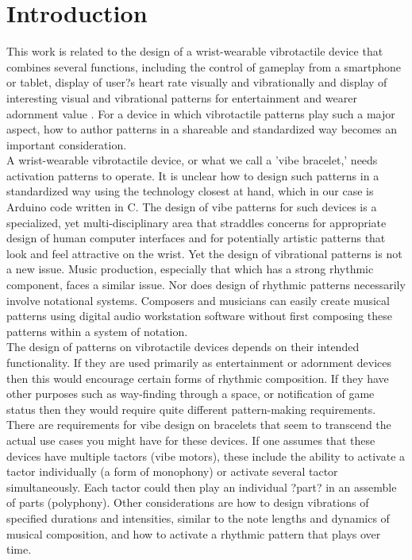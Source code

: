 \documentclass[a4paper, twocolumn]{article}
\begin{document}
\section{Introduction}
This work is related to the design of a wrist-wearable vibrotactile device that combines several functions, including the control of gameplay from a smartphone or tablet, display of user?s heart rate visually and vibrationally and display of interesting visual and vibrational patterns for entertainment and wearer adornment value \cite{tindale2014wearable}. For a device in which vibrotactile patterns play such a major aspect, how to author patterns in a shareable and standardized way becomes an important consideration.\\

A wrist-wearable vibrotactile device, or what we call a 'vibe bracelet,' needs activation patterns to operate. It is unclear how to design such patterns in a standardized way using the technology closest at hand, which in our case is Arduino code written in C. The design of vibe patterns for such devices is a specialized, yet multi-disciplinary area that straddles concerns for appropriate design of human computer interfaces and for potentially artistic patterns that look and feel attractive on the wrist. Yet the design of vibrational patterns is not a new issue. Music production, especially that which has a strong rhythmic component, faces a similar issue. Nor does design of rhythmic patterns necessarily involve notational systems. Composers and musicians can easily create musical patterns using digital audio workstation software without first composing these patterns within a system of notation.\\

The design of patterns on vibrotactile devices depends on their intended functionality. If they are used primarily as entertainment or adornment devices then this would encourage certain forms of rhythmic composition. If they have other purposes such as way-finding through a space, or notification of game status then they would require quite different pattern-making requirements.\\ 

There are requirements for vibe design on bracelets that seem to transcend the actual use cases you might have for these devices. If one assumes that these devices have multiple tactors (vibe motors), these include the ability to activate a tactor individually (a form of monophony) or activate several tactor simultaneously. Each tactor could then play an individual ?part? in an assemble of parts (polyphony). Other considerations are how to design vibrations of specified durations and intensities, similar to the note lengths and dynamics of musical composition, and how to activate a rhythmic pattern that plays over time.\\
\end{document}
